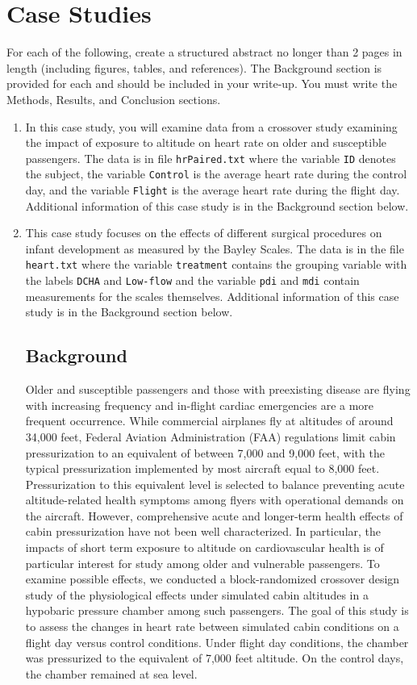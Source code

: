 \documentclass{article}
\begin{document}
	\section*{Case Studies}
	For each of the following, create a structured abstract no longer than 2 pages in length (including figures, tables, and references). The Background section is provided for each and should be included in your write-up. You must write the Methods, Results, and Conclusion sections.
	\begin{enumerate}
		\item In this case study, you will examine data from a crossover study examining the impact of exposure to altitude on heart rate on older and susceptible passengers. The data is in file \texttt{hrPaired.txt} where the variable \texttt{ID} denotes the subject, the variable \texttt{Control} is the average heart rate during the control day, and the variable \texttt{Flight} is the average heart rate during the flight day. Additional information of this case study is in the Background section below.
		
		\item This case study focuses on the effects of different surgical procedures on infant development as measured by the Bayley Scales. The data is in the file \texttt{heart.txt} where the variable \texttt{treatment} contains the grouping variable with the labels \texttt{DCHA} and \texttt{Low-flow} and the variable \texttt{pdi} and \texttt{mdi} contain measurements for the scales themselves. Additional information of this case study is in the Background section below.

		\newpage
		\subsection*{Background}
		
		Older and susceptible passengers and those with preexisting disease are flying with increasing frequency and in-flight cardiac emergencies are a more frequent occurrence. While commercial airplanes fly at altitudes of around 34,000 feet, Federal Aviation Administration (FAA) regulations limit cabin pressurization to an equivalent of between 7,000 and 9,000 feet, with the typical pressurization implemented by most aircraft equal to 8,000 feet. Pressurization to this equivalent level is selected to balance preventing acute altitude-related health symptoms among flyers with operational demands on the aircraft. However, comprehensive acute and longer-term health effects of cabin pressurization have not been well characterized. In particular, the impacts of short term exposure to altitude on cardiovascular health is of particular interest for study among older and vulnerable passengers. To examine possible effects, we conducted a block-randomized crossover design study of the physiological effects under simulated cabin altitudes in a hypobaric pressure chamber among such passengers. The goal of this study is to assess the changes in heart rate between simulated cabin conditions on a flight day versus control conditions. Under flight day conditions, the chamber was pressurized to the equivalent of 7,000 feet altitude. On the control days, the chamber remained at sea level.


\end{enumerate}
\end{document}
